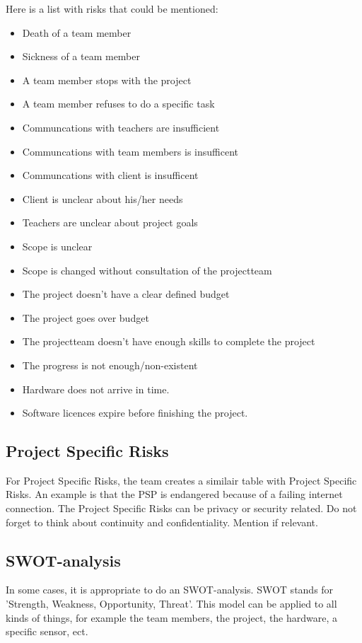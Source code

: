 \documentclass[10pt]{report}
\begin{document}
Here is a list with risks that could be mentioned:

\begin{itemize}
	\item Death of a team member
	\item Sickness of a team member
	\item A team member stops with the project
	\item A team member refuses to do a specific task
	\item Communcations with teachers are insufficient
	\item Communcations with team members is insufficent
	\item Communcations with client is insufficent
	\item Client is unclear about his/her needs
	\item Teachers are unclear about project goals
	\item Scope is unclear
	\item Scope is changed without consultation of the projectteam
	\item The project doesn't have a clear defined budget
	\item The project goes over budget
	\item The projectteam doesn't have enough skills to complete the project
	\item The progress is not enough/non-existent
	\item Hardware does not arrive in time.
	\item Software licences expire before finishing the project.
\end{itemize}

\subsection{Project Specific Risks}

For Project Specific Risks, the team creates a similair table with Project Specific Risks. An example is that the PSP is endangered because of a failing internet connection. The Project Specific Risks can be privacy or security related. Do not forget to think about continuity and confidentiality. Mention if relevant.

\subsection{SWOT-analysis}

In some cases, it is appropriate to do an SWOT-analysis. SWOT stands for 'Strength, Weakness, Opportunity, Threat'. This model can be applied to all kinds of things, for example the team members, the project, the hardware, a specific sensor, ect. 
\end{document}
